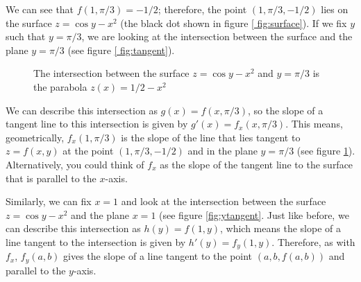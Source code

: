 We can see that $f(1, \pi/3) = -1/2$; therefore, the point $(1, \pi/3, -1/2)$ 
lies on the surface $z = \cos{y} - x^2$ (the black dot shown in figure \ref{
fig:surface}). If we fix $y$ such that $y = \pi/3$, we are looking at the 
intersection between the surface and the plane $y = \pi/3$ (see figure \ref{
fig:tangent}). 

\begin{figure}[htbp]
    \centering
    \caption{The intersection between the surface $z = \cos{y} - x^2$ and $y = 
    \pi/3$ is the parabola $z(x) = 1/2 - x^2$}
    \label{fig:tangent}
\end{figure}

We can describe this intersection as $g(x) = f(x, \pi/3)$, so the 
slope of a tangent line to this intersection is given by $g'(x) = f_x(x, 
\pi/3)$. This means, geometrically, $f_x(1, \pi/3)$ is the slope of the line 
that lies tangent to $z = f(x, y)$ at the point $(1, \pi/3, -1/2)$ and in the 
plane $y = \pi/3$ (see figure \ref{fig:tangent}). Alternatively, you could 
think of $f_x$ as the slope of the tangent line to the surface that is 
parallel to the $x$-axis. 

Similarly, we can fix $x = 1$ and look at the intersection between the surface 
$z = \cos{y} - x^2$ and the plane $x = 1$ (see figure \ref{fig:ytangent}. 
Just like before, we can describe this intersection as $h(y) = f(1, y)$, which 
means the slope of a line tangent to the intersection is given by $h'(y) = 
f_{y}(1, y)$. Therefore, as with $f_x$, $f_y(a, b)$ gives the slope of a line 
tangent to the point $\left(a, b, f(a, b) \right)$ and parallel to the $y$-axis. 


